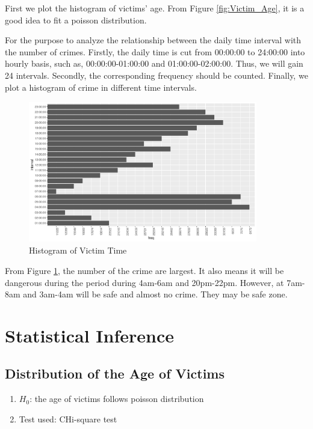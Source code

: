 \documentclass[UTF8]{article}
\begin{document}
First we plot the histogram of victims' age. From Figure \ref{fig:Victim_Age}, it is a good idea to fit a poisson distribution.


\newpage

For the purpose to analyze the relationship between the daily time interval with the number of crimes. Firstly, the daily time is cut from 00:00:00 to 24:00:00 into hourly basis, such as, 00:00:00-01:00:00 and 01:00:00-02:00:00. Thus, we will gain 24 intervals. Secondly, the corresponding frequency should be counted. Finally, we plot a histogram of crime in different time intervals.

\begin{figure}[htb]
    \includegraphics[width=10cm,height=6.18cm]{../image/2.pdf}
    \caption{Histogram of Victim Time}\label{fig:Victim_time} 
\end{figure}

From Figure \ref{fig:Victim_time}, the number of the crime are largest. It also means it will be dangerous during the period during 4am-6am and 20pm-22pm. However, at 7am-8am and 3am-4am will be safe and almost no crime. They may be safe zone.


\section{Statistical Inference}

\subsection{Distribution of the Age of Victims}

\begin{enumerate}[-]
    \item $H_0$: the age of victims follows poisson distribution
    \item Test used: CHi-square test
\end{enumerate}
\end{document}
